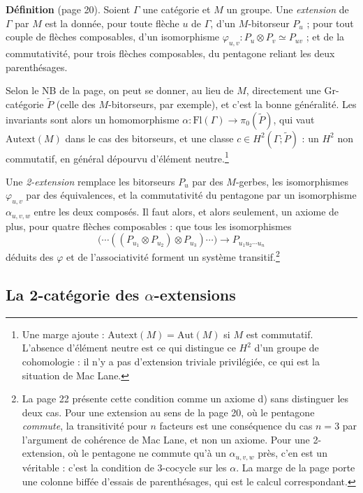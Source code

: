 \documentclass[11pt,a4paper]{article}
\begin{document}
\textbf{Définition} (page 20). Soient $\Gamma$ une catégorie et $M$ un groupe.
Une \emph{extension} de $\Gamma$ par $M$ est la donnée, pour toute flèche $u$
de $\Gamma$, d'un $M$-bitorseur $P_{u}$ ; pour tout couple de flèches
composables, d'un isomorphisme $\varphi_{u,v} : P_{u} \otimes P_{v} \simeq
P_{uv}$ ; et de la commutativité, pour trois flèches composables, du
pentagone reliant les deux parenthésages.

Selon le NB de la page, on peut se donner, au lieu de $M$, directement
une Gr-catégorie $\widetilde{P}$ (celle des $M$-bitorseurs, par exemple), et
c'est la bonne généralité. Les invariants sont alors un
homomorphisme $\alpha : \mathrm{Fl}(\Gamma) \to \pi_{0}(\widetilde{P})$, qui
vaut $\mathrm{Autext}(M)$ dans le cas des bitorseurs, et une classe $c \in
H^{2}(\Gamma; \widetilde{P})$ : un $H^{2}$ non commutatif, en général dépourvu
d'élément neutre.\footnote{Une marge ajoute : $\mathrm{Autext}(M) =
\mathrm{Aut}(M)$ si $M$ est commutatif. L'absence d'élément neutre est ce qui
distingue ce $H^{2}$ d'un groupe de cohomologie : il n'y a pas d'extension
triviale privilégiée, ce qui est la situation de Mac Lane.}

Une \emph{2-extension} remplace les bitorseurs $P_{u}$ par des $M$-gerbes, les
isomorphismes $\varphi_{u,v}$ par des équivalences, et la commutativité du
pentagone par un isomorphisme $\alpha_{u,v,w}$ entre les deux composés. Il
faut alors, et alors seulement, un axiome de plus, pour quatre flèches
composables : que tous les isomorphismes
\[
\bigl(\cdots((P_{u_{1}} \otimes P_{u_{2}}) \otimes P_{u_{3}}) \cdots\bigr)
\longrightarrow P_{u_{1}u_{2}\cdots u_{n}}
\]
déduits des $\varphi$ et de l'associativité forment un système
transitif.\footnote{La page 22 présente cette condition comme un axiome d) sans
distinguer les deux cas. Pour une
extension au sens de la page 20, où le pentagone \emph{commute}, la
transitivité pour $n$ facteurs est une conséquence du cas $n = 3$ par
l'argument de cohérence de Mac Lane, et non un axiome. Pour une 2-extension,
où le pentagone ne commute qu'à un $\alpha_{u,v,w}$ près, c'en est un
véritable : c'est la condition de 3-cocycle sur les $\alpha$. La marge de la
page porte une colonne biffée d'essais de parenthésages, qui est le calcul
correspondant.}

\subsection*{La 2-catégorie des $\alpha$-extensions}
\end{document}
